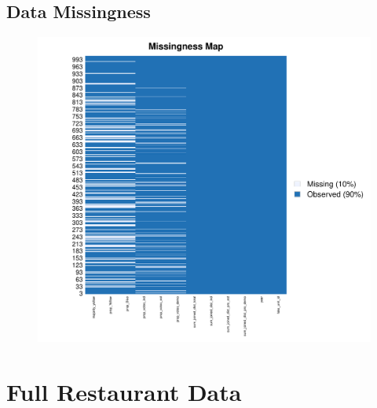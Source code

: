 \documentclass[letterpaper, 12pt]{article}
\begin{document}
\begin{appendices}
\subsection{Data Missingness}
\clearpage
\begin{figure}[!h]
    \centering
    \includegraphics[scale=0.7]{Visuals/missingness.pdf}
    \label{fig:my_label}
\end{figure}








\section{Full Restaurant Data} \label{appendix;full_restaurant}


\end{appendices}
\end{document}
